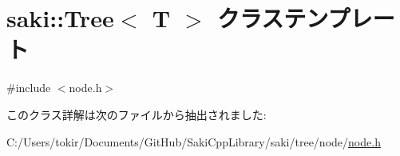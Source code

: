 \hypertarget{classsaki_1_1_tree}{}\section{saki\+:\+:Tree$<$ T $>$ クラステンプレート}
\label{classsaki_1_1_tree}


{\ttfamily \#include $<$node.\+h$>$}



このクラス詳解は次のファイルから抽出されました\+:\begin{DoxyCompactItemize}
\item 
C\+:/\+Users/tokir/\+Documents/\+Git\+Hub/\+Saki\+Cpp\+Library/saki/tree/node/\mbox{\hyperlink{node_8h}{node.\+h}}\end{DoxyCompactItemize}
